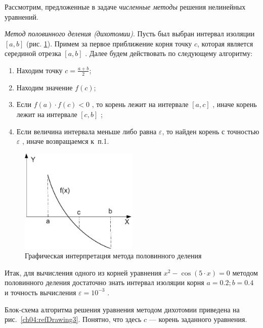 Рассмотрим, предложенные в задаче \emph{численные методы }решения нелинейных уравнений.

\emph{Метод половинного деления (дихотомии)}. Пусть был выбран интервал изоляции  $[a,b]$  (рис.
\ref{ch04:refDrawing2}). Примем за первое приближение корня точку $c$, которая является серединой отрезка 
$[a,b]$ . Далее будем действовать по следующему алгоритму:
\begin{enumerate}
\item Находим точку  $c=\frac{a+b}{2}$;
\item Находим значение  $f(c)$;
\item Если  $f(a)\cdot f(c)<0$ , то корень лежит на интервале  $[a,c]$ , иначе корень лежит на интервале  $[c,b]$ ;
\item Если величина интервала меньше либо равна  $\varepsilon$, то найден корень с точностью  $\varepsilon$ , иначе
возвращаемся к~п.1.
\end{enumerate}

\begin{figure}[htb]
\begin{center}
\includegraphics[width=0.5\textwidth]{img/ris_4_3}
\caption{Графическая интерпретация метода половинного деления}
\label{ch04:refDrawing2}
\end{center}
\end{figure}

Итак, для вычисления одного из корней уравнения  $x^2-\cos (5\cdot x)=0$  методом половинного деления достаточно знать
интервал изоляции корня  $a=0.2;b=0.4$  и точность вычисления  $\varepsilon=10^{-3}$ . 

Блок-схема алгоритма решения уравнения методом дихотомии приведена на рис.~\ref{ch04:refDrawing3}. 
Понятно, что здесь  $c$  --- корень заданного уравнения.

